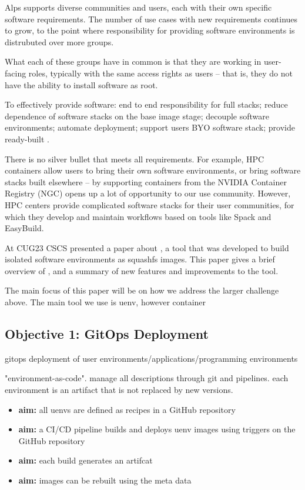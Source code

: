 Alps supports diverse communities and users, each with their own specific software requirements.
The number of use cases with new requirements continues to grow, to the point where responsibility for providing software environments is distrubuted over more groups.

What each of these groups have in common is that they are working in user-facing roles, typically with the same access rights as users -- that is, they do not have the ability to install software as root.

To effectively provide software: end to end responsibility for full stacks; reduce dependence of software stacks on the base image stage; decouple software environments; automate deployment; support users BYO software stack; provide ready-built .

There is no silver bullet that meets all requirements.
For example, HPC containers allow users to bring their own software environments, or bring software stacks built elsewhere -- by supporting containers from the NVIDIA Container Registry (NGC) opens up a lot of opportunity to our use community.
However, HPC centers provide complicated software stacks for their user communities, for which they develop and maintain workflows based on tools like Spack and EasyBuild.

At CUG23 CSCS presented a paper about \stackinator, a tool that was developed to build isolated software environments as squashfs images.
This paper gives a brief overview of \stackinator, and a summary of new features and improvements to the tool.

The main focus of this paper will be on how we address the larger challenge above.
The main tool we use is uenv, however container 

\subsection{Objective 1: GitOps Deployment}

gitops deployment of user environments/applications/programming environments

"environment-as-code".
manage all descriptions through git and pipelines.
each environment is an artifact that is not replaced by new versions.

\begin{itemize}
    \item \textbf{aim:} all uenvs are defined as recipes in a GitHub repository
    \item \textbf{aim:} a CI/CD pipeline builds and deploys uenv images using triggers on the GitHub repository
    \item \textbf{aim:} each build generates an artifcat
    \item \textbf{aim:} images can be rebuilt using the meta data
\end{itemize}

